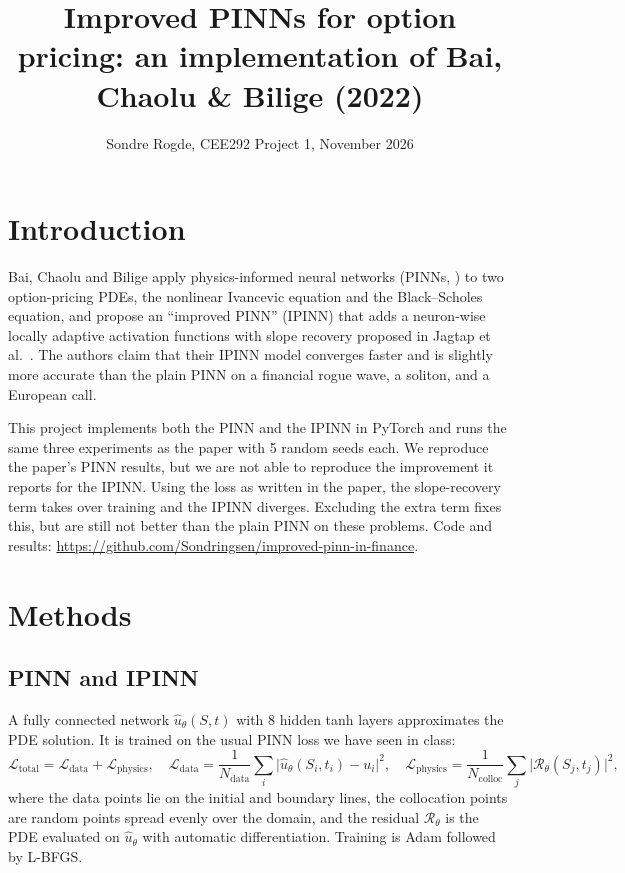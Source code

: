 \documentclass[10pt]{article}
\title{\vspace{-2.2cm}Improved PINNs for option pricing: an implementation of Bai, Chaolu \& Bilige (2022)}
\author{Sondre Rogde, CEE292 Project 1, November 2026}
\date{}
\begin{document}
\maketitle
\vspace{-2em}

\section{Introduction}

Bai, Chaolu and Bilige \cite{bai2022} apply physics-informed neural networks (PINNs, \cite{raissi2019})
to two option-pricing PDEs, the nonlinear Ivancevic equation and the Black--Scholes equation, and
propose an ``improved PINN'' (IPINN) that adds a neuron-wise locally adaptive activation functions
with slope recovery proposed in Jagtap et al.\ \cite{jagtap2020}. The authors claim that their IPINN model converges faster
and is slightly more accurate than the plain PINN on a financial rogue wave, a soliton, and a European call.

This project implements both the PINN and the IPINN in PyTorch and runs the same three experiments as the paper
with 5 random seeds each. We reproduce the paper's PINN results, but we are not able to reproduce the improvement it reports for
the IPINN. Using the loss as written in the paper, the slope-recovery term takes over training and the
IPINN diverges. Excluding the extra term fixes this, but are still not better than the plain
PINN on these problems. Code and results: \url{https://github.com/Sondringsen/improved-pinn-in-finance}.

\section{Methods}

\subsection{PINN and IPINN}

A fully connected network $\hat u_\theta(S,t)$ with 8 hidden tanh layers approximates the PDE solution.
It is trained on the usual PINN loss we have seen in class:
\begin{equation}
  \mathcal{L}_{\text{total}} = \mathcal{L}_{\text{data}} + \mathcal{L}_{\text{physics}}, \quad
  \mathcal{L}_{\text{data}} = \frac{1}{N_{\text{data}}}\sum_{i} \big|\hat u_\theta(S_i,t_i) - u_i\big|^2, \quad
  \mathcal{L}_{\text{physics}} = \frac{1}{N_{\text{colloc}}}\sum_{j} \big|\mathcal{R}_\theta(S_j,t_j)\big|^2,
\end{equation}
where the data points lie on the initial and boundary lines, the collocation points are random points spread
evenly over the domain, and the residual $\mathcal{R}_\theta$ is the PDE evaluated on $\hat u_\theta$ with
automatic differentiation. Training is Adam followed by L-BFGS.
\end{document}
